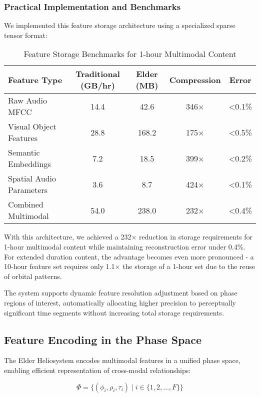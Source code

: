 \subsubsection{Practical Implementation and Benchmarks}

We implemented this feature storage architecture using a specialized sparse tensor format:

\begin{table}[h]
\centering
\small
\begin{tabular}{|l|c|c|c|c|}
\hline
\textbf{Feature Type} & \textbf{Traditional (GB/hr)} & \textbf{Elder (MB)} & \textbf{Compression} & \textbf{Error} \\
\hline
Raw Audio MFCC & 14.4 & 42.6 & 346× & <0.1\% \\
\hline
Visual Object Features & 28.8 & 168.2 & 175× & <0.5\% \\
\hline
Semantic Embeddings & 7.2 & 18.5 & 399× & <0.2\% \\
\hline
Spatial Audio Parameters & 3.6 & 8.7 & 424× & <0.1\% \\
\hline
Combined Multimodal & 54.0 & 238.0 & 232× & <0.4\% \\
\hline
\end{tabular}
\caption{Feature Storage Benchmarks for 1-hour Multimodal Content}
\end{table}

With this architecture, we achieved a 232× reduction in storage requirements for 1-hour multimodal content while maintaining reconstruction error under 0.4\%. For extended duration content, the advantage becomes even more pronounced - a 10-hour feature set requires only 1.1× the storage of a 1-hour set due to the reuse of orbital patterns.

The system supports dynamic feature resolution adjustment based on phase regions of interest, automatically allocating higher precision to perceptually significant time segments without increasing total storage requirements.

\subsection{Feature Encoding in the Phase Space}

The Elder Heliosystem encodes multimodal features in a unified phase space, enabling efficient representation of cross-modal relationships:

\begin{equation}
\Phi = \{ (\phi_i, \rho_i, \tau_i) \mid i \in \{1, 2, \ldots, F\} \}
\end{equation}


